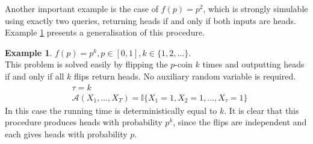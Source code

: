 \documentclass{article}
\theoremstyle{definition}
\newtheorem{example}{Example}
\newcommand{\A}{\mathcal{A}}
\begin{document}
Another important example is the case of $f(p)=p^2$, which is strongly simulable using exactly two queries, returning heads if and only if both inputs are heads. Example \ref{ex:bf_pk} presents a generalisation of this procedure.

\begin{example}\label{ex:bf_pk}
$f(p) = p^k, p\in[0,1], k\in\{1,2,\dots\}$.\\
This problem is solved easily by flipping the $p$-coin $k$ times and outputting heads if and only if all $k$ flips return heads. No auxiliary random variable is required.
\begin{align*}
& \tau = k \\
& \A(X_1,\dots,X_T) = \mathbb{I}\{X_1 =1, X_2=1 ,\dots,X_\tau=1\}
\end{align*}
In this case the running time is deterministically equal to $k$. It is clear that this procedure produces heads with probability $p^k$, since the flips are independent and each gives heads with probability $p$.


\end{example}
\end{document}
